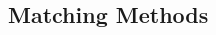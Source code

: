 \documentclass[12pt]{article}
\begin{document}
\begin{multicols}{2}
% 
% 
% 
% 
% 
% 
% 
% 
% 
% 



\section*{Matching Methods}


\end{multicols}
\end{document}
